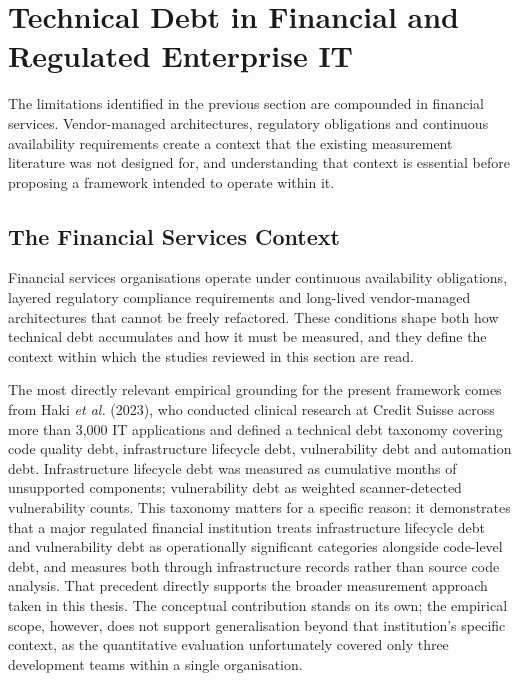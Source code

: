 \documentclass[
  12pt,
  letterpaper,
  12pt,
  oneside,
  english,
  onehalfspacing,
  headsepline]{MastersDoctoralThesis}
\begin{document}
\section{Technical Debt in Financial and Regulated Enterprise
IT}\label{technical-debt-in-financial-and-regulated-enterprise-it}

The limitations identified in the previous section are compounded in
financial services. Vendor-managed architectures, regulatory obligations
and continuous availability requirements create a context that the
existing measurement literature was not designed for, and understanding
that context is essential before proposing a framework intended to
operate within it.

\subsection{The Financial Services
Context}\label{the-financial-services-context}

Financial services organisations operate under continuous availability
obligations, layered regulatory compliance requirements and long-lived
vendor-managed architectures that cannot be freely refactored. These
conditions shape both how technical debt accumulates and how it must be
measured, and they define the context within which the studies reviewed
in this section are read.

The most directly relevant empirical grounding for the present framework
comes from Haki \emph{et al.} (2023), who conducted clinical research at
Credit Suisse across more than 3,000 IT applications and defined a
technical debt taxonomy covering code quality debt, infrastructure
lifecycle debt, vulnerability debt and automation debt. Infrastructure
lifecycle debt was measured as cumulative months of unsupported
components; vulnerability debt as weighted scanner-detected
vulnerability counts. This taxonomy matters for a specific reason: it
demonstrates that a major regulated financial institution treats
infrastructure lifecycle debt and vulnerability debt as operationally
significant categories alongside code-level debt, and measures both
through infrastructure records rather than source code analysis. That
precedent directly supports the broader measurement approach taken in
this thesis. The conceptual contribution stands on its own; the
empirical scope, however, does not support generalisation beyond that
institution's specific context, as the quantitative evaluation
unfortunately covered only three development teams within a single
organisation.
\end{document}
